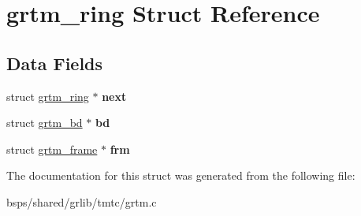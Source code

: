 \hypertarget{structgrtm__ring}{}\section{grtm\+\_\+ring Struct Reference}
\label{structgrtm__ring}
\subsection*{Data Fields}
\begin{DoxyCompactItemize}
\item 
\mbox{\label{structgrtm__ring_ac2cd45b4c33405f03233039cdff412e2}} 
struct \mbox{\hyperlink{structgrtm__ring}{grtm\+\_\+ring}} $\ast$ {\bfseries next}
\item 
\mbox{\label{structgrtm__ring_ab15b0e656f357f0ca12162ff10856278}} 
struct \mbox{\hyperlink{structgrtm__bd}{grtm\+\_\+bd}} $\ast$ {\bfseries bd}
\item 
\mbox{\label{structgrtm__ring_a6bb562945905fb970c55baa12a97fa57}} 
struct \mbox{\hyperlink{structgrtm__frame}{grtm\+\_\+frame}} $\ast$ {\bfseries frm}
\end{DoxyCompactItemize}


The documentation for this struct was generated from the following file\+:\begin{DoxyCompactItemize}
\item 
bsps/shared/grlib/tmtc/grtm.\+c\end{DoxyCompactItemize}
